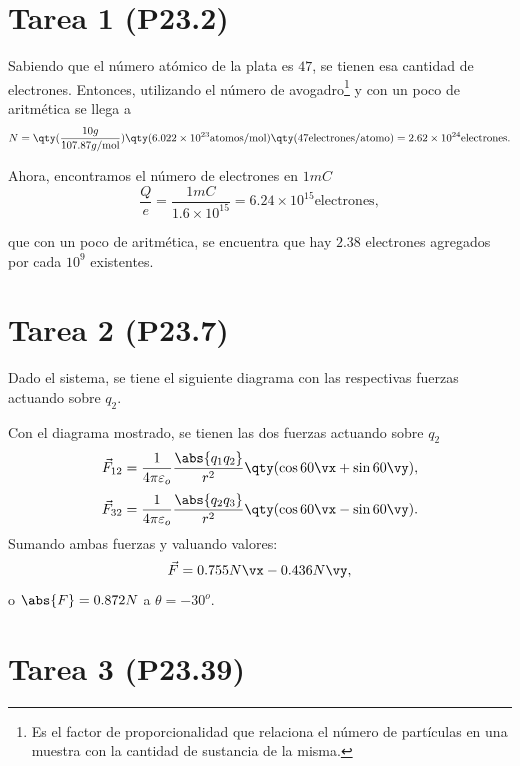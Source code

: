 \section*{Tarea 1 (P23.2)}

Sabiendo que el número atómico de la plata es $47$, se tienen esa cantidad de electrones. Entonces, utilizando el número de avogadro\footnote{Es el factor de proporcionalidad que relaciona el número de partículas en una muestra con la cantidad de sustancia de la misma.} y con un poco de aritmética se llega a
	$$ N = \qty(\frac{10g}{107.87g/\text{mol}}) \qty(6.022\times 10^{23} \text{atomos}/\text{mol}) \qty(47 \text{electrones}/\text{atomo}) = 2.62\times 10^{24} \text{electrones}. $$
	
Ahora, encontramos el número de electrones en $1mC$
	$$ \frac{Q}{e} = \frac{1mC}{1.6\times 10^{15}} = 6.24\times 10^{15} \text{electrones}, $$

que con un poco de aritmética, se encuentra que hay $2.38$ electrones agregados por cada $10^9$ existentes.








\section*{Tarea 2 (P23.7)}

Dado el sistema, se tiene el siguiente diagrama con las respectivas fuerzas actuando sobre $q_2$.
\begin{center}
	
\end{center}

Con el diagrama mostrado, se tienen las dos fuerzas actuando sobre $q_2$
	$$ \vec{F} _{12} = \frac{1}{4\pi \varepsilon _o} \frac{\abs{q_1 q_2}}{r^2} \qty(\cos{60} \vx + \sin{60} \vy), $$
	$$ \vec{F} _{32} = \frac{1}{4\pi \varepsilon _o} \frac{\abs{q_2 q_3}}{r^2} \qty(\cos{60} \vx - \sin{60} \vy). $$
Sumando ambas fuerzas y valuando valores:
	$$ \vec{F} = 0.755 N \vx - 0.436N\vy , $$
o $\abs{F} = 0.872N$ a $\theta = -30^o$.











\section*{Tarea 3 (P23.39)}

